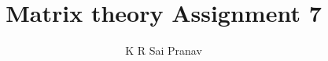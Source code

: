 \documentclass[journal,12pt,twocolumn]{IEEEtran}
\begin{document}
\makeatletter
{}
\makeatother
\let\StandardTheFigure\thefigure
\let\vec\mathbf
\renewcommand{\thefigure}{\theproblem}
\def\putbox#1#2#3{\makebox[0in][l]{\makebox[#1][l]{}\raisebox{\baselineskip}[0in][0in]{\raisebox{#2}[0in][0in]{#3}}}}
     \def\rightbox#1{\makebox[0in][r]{#1}}
     \def\centbox#1{\makebox[0in]{#1}}
     \def\topbox#1{\raisebox{-\baselineskip}[0in][0in]{#1}}
     \def\midbox#1{\raisebox{-0.5\baselineskip}[0in][0in]{#1}}
\vspace{3cm}
\title{Matrix theory Assignment 7}
\author{K R Sai Pranav}
%
%
%
% 
%
\end{document}
